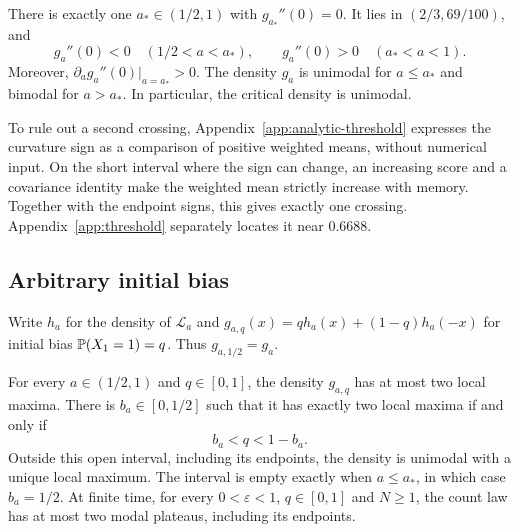 \begin{theorem}\label{thm:threshold}
There is exactly one $a_*\in(1/2,1)$ with $g_{a_*}''(0)=0$.
It lies in $(2/3,69/100)$, and
\[
 g_a''(0)<0\quad(1/2<a<a_*),\qquad
 g_a''(0)>0\quad(a_*<a<1).
\]
Moreover, $\partial_a g_a''(0)|_{a=a_*}>0$.
The density $g_a$ is unimodal for $a\le a_*$ and bimodal for
$a>a_*$. In particular, the critical density is unimodal.
\end{theorem}

To rule out a second crossing, Appendix~\ref{app:analytic-threshold}
expresses the curvature sign as a comparison of positive weighted
means, without numerical input. On the short interval where the
sign can change, an increasing score and a covariance identity make
the weighted mean strictly increase with memory. Together with the
endpoint signs, this gives exactly one crossing.
Appendix~\ref{app:threshold} separately locates it near $0.6688$.

\subsection{Arbitrary initial bias}

Write $h_a$ for the density of $\mathcal L_a$ and
$g_{a,q}(x)=q h_a(x)+(1-q)h_a(-x)$ for initial bias
$\mathbb{P}(X_1=1)=q$. Thus $g_{a,1/2}=g_a$.

\begin{theorem}\label{thm:biased-limit-modes}
For every $a\in(1/2,1)$ and $q\in[0,1]$, the density $g_{a,q}$ has at
most two local maxima. There is $b_a\in[0,1/2]$ such that it has exactly
two local maxima if and only if
\[
                 b_a<q<1-b_a.
\]
Outside this open interval, including its endpoints, the density is
unimodal with a unique local maximum. The interval is empty exactly when
$a\le a_*$, in which case $b_a=1/2$.
At finite time, for every $0<\varepsilon<1$, $q\in[0,1]$ and
$N\ge1$, the count law has at most two modal plateaus, including its
endpoints.
\end{theorem}

